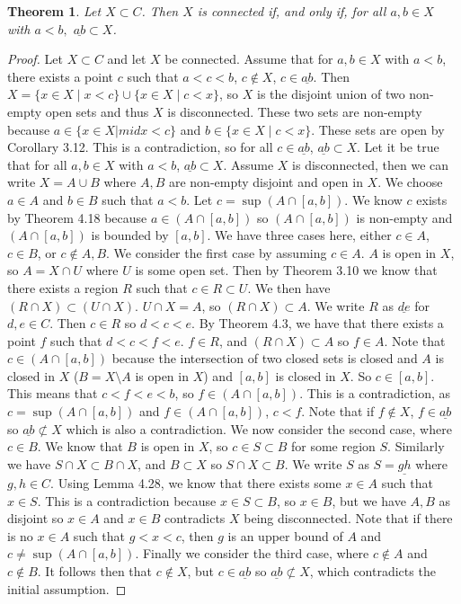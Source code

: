 \documentclass[12pt]{article}
\renewcommand{\_}[1]{\underline{ #1 }}
\newtheorem{theorem}{Theorem}[section]
\theoremstyle{definition}
\numberwithin{equation}{subsection}
\begin{document}
\begin{theorem}
Let $X\subset C$. Then $X$ is connected if, and only if, for all $a,b\in X$ with $a<b,$ $\underline{ab}\subset X$.
\end{theorem}

\begin{proof}
Let $X \subset C$ and let $X$ be connected. Assume that for $a,b \in X$ with $a < b$, there exists a point $c$ such that $a < c < b$, $c \not \in X$, $c \in \_{ab}$. Then $X = \{x \in X \mid x < c\} \cup \{x \in X \mid c < x\}$, so $X$ is the disjoint union of two non-empty open sets and thus $X$ is disconnected. These two sets are non-empty because $a \in \{x \in X |mid x < c\}$ and $b \in \{x \in X \mid c < x\}$. These sets are open by Corollary 3.12. This is a contradiction, so for all $c \in \_{ab}$, $\_{ab} \subset X$.
\newline Let it be true that for all $a,b \in X$ with $a < b$, $\_{ab} \subset X$. Assume $X$ is disconnected, then we can write $X = A \cup B$ where $A,B$ are non-empty disjoint and open in $X$. We choose $a \in A$ and $b \in B$ such that $a < b$. Let $c = \sup(A \cap [a,b])$. We know $c$ exists by Theorem 4.18 because $a \in (A \cap [a,b])$ so $(A \cap [a,b])$ is non-empty and $(A \cap [a,b])$ is bounded by $[a,b]$. We have three cases here, either $c \in A$, $c \in B$, or $c \not \in A,B$. We consider the first case by assuming $c \in A$. $A$ is open in $X$, so $A = X \cap U$ where $U$ is some open set. Then by Theorem 3.10 we know that there exists a region $R$ such that $c \in R \subset U$. We then have $(R \cap X) \subset (U \cap X)$. $U \cap X = A$, so $(R \cap X) \subset A$. We write $R$ as $\_{de}$ for $d,e \in C$. Then $c \in R$ so $d < c < e$. By Theorem 4.3, we have that there exists a point $f$ such that $d < c < f < e$. $f \in R$, and $(R \cap X) \subset A$ so $f \in A$. Note that $c \in (A \cap [a,b])$ because the intersection of two closed sets is closed and $A$ is closed in $X$ ($B = X \setminus A$ is open in $X$) and $[a,b]$ is closed in $X$. So $c \in [a,b]$. This means that $c < f < e < b$, so $f \in (A \cap [a,b])$. This is a contradiction, as $c = \sup(A \cap [a,b])$ and $f \in (A \cap [a,b])$, $c < f$. Note that if $f \not \in X$, $f \in \_{ab}$ so $\_{ab} \not \subset X$ which is also a contradiction. We now consider the second case, where $c \in B$. We know that $B$ is open in $X$, so $c \in S \subset B$ for some region $S$. Similarly we have $S \cap X \subset B \cap X$, and $B \subset X$ so $S \cap X \subset B$. We write $S$ as $S = \_{gh}$ where $g,h \in C$. Using Lemma 4.28, we know that there exists some $x \in A$ such that $x \in S$. This is a contradiction because $x \in S \subset B$, so $x \in B$, but we have $A,B$ as disjoint so $x \in A$ and $x \in B$ contradicts $X$ being disconnected. Note that if there is no $x \in A$ such that $g < x < c$, then $g$ is an upper bound of $A$ and $c \not = \sup(A \cap [a,b])$. Finally we consider the third case, where $c \not \in A$ and $c \not \in B$. It follows then that $c \not \in X$, but $c  \in \_{ab}$ so $\_{ab} \not \subset X$, which contradicts the initial assumption.
\end{proof}
\end{document}
